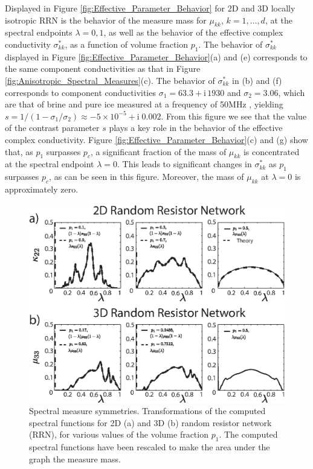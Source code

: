\documentclass{cmslatex}
\newcommand{\I}{\mathrm{i}}
\begin{document}
Displayed in Figure \ref{fig:Effective_Parameter_Behavior} for 2D and
3D locally isotropic RRN is the behavior of the measure mass for
$\mu_{kk}$, $k=1,\ldots,d$, at the spectral endpoints $\lambda=0,1$, as well as 
the behavior of the effective complex conductivity $\sigma^*_{kk}$, as a
function of volume fraction $p_1$. The behavior of $\sigma^*_{kk}$
displayed in Figure \ref{fig:Effective_Parameter_Behavior}(a) and (e)
corresponds to the same component conductivities as that in Figure
\ref{fig:Anisotropic_Spectral_Measures}(c). The behavior of $\sigma^*_{kk}$
in (b) and (f) corresponds to component conductivities
$\sigma_1=63.3+\I\,1930$ and $\sigma_2=3.06$, which are that of brine and pure
ice measured at a frequency of 50MHz \cite{Backstrom:2007:Book},
yielding $s=1/(1-\sigma_1/\sigma_2)\approx-5\times10^{-5}+\I\;0.002$. From this figure we
see that the value of the contrast parameter $s$ plays a key role in the
behavior of the effective complex conductivity. Figure
\ref{fig:Effective_Parameter_Behavior}(c) and (g) show that, as $p_1$
surpasses $p_c$, a significant fraction of the mass of $\mu_{kk}$ is
concentrated at the spectral endpoint $\lambda=0$. This leads to
significant changes in $\sigma^*_{kk}$ as $p_1$ surpasses $p_c$, as can be
seen in this figure. Moreover, the mass of $\mu_{kk}$ at $\lambda=0$ is
approximately zero.


%
\begin{figure}[t]
  \centerline{\includegraphics[scale=0.97]{Spectral_Function_Symmetries.eps}} 
\caption{Spectral measure symmetries. Transformations of the computed
  spectral functions for 2D (a) and 3D (b) random resistor network
  (RRN), for various values of the volume fraction $p_1$. The computed
  spectral functions have been rescaled to make the area
  under the graph the measure mass.  
        }
\label{fig:Spectral_Function_Symmetries}
\end{figure}
%
\end{document}
